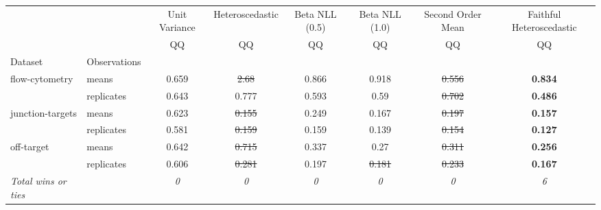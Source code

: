\begin{tabular}{ll|c|c|c|c|c|c}
\toprule
{} & {} & {Unit Variance} & {Heteroscedastic} & {Beta NLL (0.5)} & {Beta NLL (1.0)} & {Second Order Mean} & {Faithful Heteroscedastic} \\
{} & {} & {QQ} & {QQ} & {QQ} & {QQ} & {QQ} & {QQ} \\
{Dataset} & {Observations} & {} & {} & {} & {} & {} & {} \\
\midrule
\multirow[t]{2}{*}{flow-cytometry} & means & 0.659 & \sout{2.68} & 0.866 & 0.918 & \sout{0.556} & \textbf{0.834} \\
 & replicates & 0.643 & 0.777 & 0.593 & 0.59 & \sout{0.702} & \textbf{0.486} \\
\multirow[t]{2}{*}{junction-targets} & means & 0.623 & \sout{0.155} & 0.249 & 0.167 & \sout{0.197} & \textbf{0.157} \\
 & replicates & 0.581 & \sout{0.159} & 0.159 & 0.139 & \sout{0.154} & \textbf{0.127} \\
\multirow[t]{2}{*}{off-target} & means & 0.642 & \sout{0.715} & 0.337 & 0.27 & \sout{0.311} & \textbf{0.256} \\
 & replicates & 0.606 & \sout{0.281} & 0.197 & \sout{0.181} & \sout{0.233} & \textbf{0.167} \\
\textit{{Total wins or ties}} &  & \textit{0} & \textit{0} & \textit{0} & \textit{0} & \textit{0} & \textit{6} \\
\bottomrule
\end{tabular}
